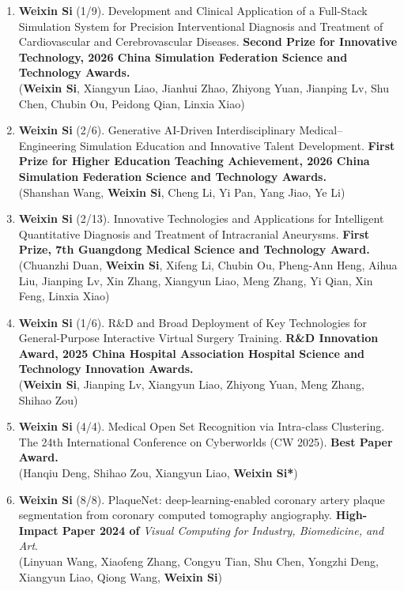 \documentclass[a4paper,12pt,english]{curve}
\begin{document}
\begin{enumerate}
\setlength{\itemsep}{0pt}
\setlength{\parsep}{0pt}
\setlength{\topsep}{0.4ex}
\item \textbf{Weixin Si} (1/9). Development and Clinical Application of a Full-Stack Simulation System for Precision Interventional Diagnosis and Treatment of Cardiovascular and Cerebrovascular Diseases. \textbf{Second Prize for Innovative Technology, 2026 China Simulation Federation Science and Technology Awards.}\\
(\textbf{Weixin Si}, Xiangyun Liao, Jianhui Zhao, Zhiyong Yuan, Jianping Lv, Shu Chen, Chubin Ou, Peidong Qian, Linxia Xiao)

\item \textbf{Weixin Si} (2/6). Generative AI-Driven Interdisciplinary Medical--Engineering Simulation Education and Innovative Talent Development. \textbf{First Prize for Higher Education Teaching Achievement, 2026 China Simulation Federation Science and Technology Awards.}\\
(Shanshan Wang, \textbf{Weixin Si}, Cheng Li, Yi Pan, Yang Jiao, Ye Li)

\item \textbf{Weixin Si} (2/13). Innovative Technologies and Applications for Intelligent Quantitative Diagnosis and Treatment of Intracranial Aneurysms. \textbf{First Prize, 7th Guangdong Medical Science and Technology Award.}\\
(Chuanzhi Duan, \textbf{Weixin Si}, Xifeng Li, Chubin Ou, Pheng-Ann Heng, Aihua Liu, Jianping Lv, Xin Zhang, Xiangyun Liao, Meng Zhang, Yi Qian, Xin Feng, Linxia Xiao)

\item \textbf{Weixin Si} (1/6). R\&D and Broad Deployment of Key Technologies for General-Purpose Interactive Virtual Surgery Training. \textbf{R\&D Innovation Award, 2025 China Hospital Association Hospital Science and Technology Innovation Awards.}\\
(\textbf{Weixin Si}, Jianping Lv, Xiangyun Liao, Zhiyong Yuan, Meng Zhang, Shihao Zou)

\item \textbf{Weixin Si} (4/4). Medical Open Set Recognition via Intra-class Clustering. The 24th International Conference on Cyberworlds (CW 2025). \textbf{Best Paper Award.}\\
(Hanqiu Deng, Shihao Zou, Xiangyun Liao, \textbf{Weixin Si*})

\item \textbf{Weixin Si} (8/8). PlaqueNet: deep-learning-enabled coronary artery plaque segmentation from coronary computed tomography angiography. \textbf{High-Impact Paper 2024 of} \emph{Visual Computing for Industry, Biomedicine, and Art}.\\
(Linyuan Wang, Xiaofeng Zhang, Congyu Tian, Shu Chen, Yongzhi Deng, Xiangyun Liao, Qiong Wang, \textbf{Weixin Si})


\end{enumerate}
\end{document}
